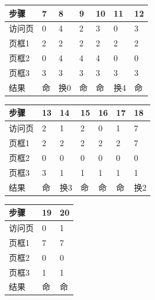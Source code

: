 \begin{wideblock}\par\medskip\noindent\begin{minipage}{\linewidth}\fontsize{9.3}{12}\selectfont\begin{tabularx}{\linewidth}{@{}YYYYYYY@{}}
\toprule\noalign{}
步骤 & 7 & 8 & 9 & 10 & 11 & 12 \\
\midrule\noalign{}


访问页 & 0 & 4 & 2 & 3 & 0 & 3 \\
页框1 & 2 & 2 & 2 & 2 & 2 & 2 \\
页框2 & 0 & 4 & 4 & 4 & 0 & 0 \\
页框3 & 3 & 3 & 3 & 3 & 3 & 3 \\
结果 & 命 & 换0 & 命 & 命 & 换4 & 命 \\
\bottomrule\end{tabularx}
\end{minipage}\par\medskip\end{wideblock}

\begin{wideblock}\par\medskip\noindent\begin{minipage}{\linewidth}\fontsize{9.3}{12}\selectfont\begin{tabularx}{\linewidth}{@{}YYYYYYY@{}}
\toprule\noalign{}
步骤 & 13 & 14 & 15 & 16 & 17 & 18 \\
\midrule\noalign{}


访问页 & 2 & 1 & 2 & 0 & 1 & 7 \\
页框1 & 2 & 2 & 2 & 2 & 2 & 7 \\
页框2 & 0 & 0 & 0 & 0 & 0 & 0 \\
页框3 & 3 & 1 & 1 & 1 & 1 & 1 \\
结果 & 命 & 换3 & 命 & 命 & 命 & 换2 \\
\bottomrule\end{tabularx}
\end{minipage}\par\medskip\end{wideblock}

\par\medskip\noindent\begin{minipage}{\linewidth}\fontsize{9.3}{12}\selectfont\begin{tabularx}{\linewidth}{@{}YYY@{}}
\toprule\noalign{}
步骤 & 19 & 20 \\
\midrule\noalign{}


访问页 & 0 & 1 \\
页框1 & 7 & 7 \\
页框2 & 0 & 0 \\
页框3 & 1 & 1 \\
结果 & 命 & 命 \\
\bottomrule\end{tabularx}
\end{minipage}\par\medskip


